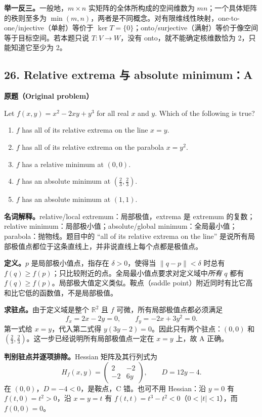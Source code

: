 \documentclass[11pt,a4paper,fontset=fandol]{ctexart}
\begin{document}
\textbf{举一反三。}一般地，$m\times n$ 实矩阵的全体所构成的空间维数为 $mn$；一个具体矩阵的秩则至多为 $\min(m,n)$，两者是不同概念。对有限维线性映射，one-to-one/injective（单射）等价于 $\ker T=\{0\}$；onto/surjective（满射）等价于像空间等于目标空间。若本题只说 $T:V\to W$，没有 onto，就不能确定核维数恰为 2，只能知道它至少为 2。

\subsection{26. Relative extrema 与 absolute minimum：A}
\label{p2:q26}
\textbf{原题（Original problem）}

Let $f(x,y)=x^2-2xy+y^3$ for all real $x$ and $y$. Which of the following is true?
\begin{enumerate}[label=(\Alph*)]
\item $f$ has all of its relative extrema on the line $x=y$.
\item $f$ has all of its relative extrema on the parabola $x=y^2$.
\item $f$ has a relative minimum at $(0,0)$.
\item $f$ has an absolute minimum at $\left(\frac23,\frac23\right)$.
\item $f$ has an absolute minimum at $(1,1)$.
\end{enumerate}
\textbf{名词解释。}relative/local extremum：局部极值，extrema 是 extremum 的复数；relative minimum：局部极小值；absolute/global minimum：全局最小值；parabola：抛物线。题目中的 ``all of its relative extrema on the line'' 是说所有局部极值点都位于这条直线上，并非说直线上每个点都是极值点。

\textbf{定义。}$p$ 是局部极小值点，指存在 $\delta>0$，使得当 $\|q-p\|<\delta$ 时总有 $f(q)\ge f(p)$；只比较附近的点。全局最小值点要求对定义域中\emph{所有} $q$ 都有 $f(q)\ge f(p)$。局部极大值定义类似。鞍点（saddle point）附近同时有比它高和比它低的函数值，不是局部极值。

\textbf{求驻点。}由于定义域是整个 $\mathbb R^2$ 且 $f$ 可微，所有局部极值点都必须满足
\[
f_x=2x-2y=0,\qquad f_y=-2x+3y^2=0.
\]
第一式给 $x=y$，代入第二式得 $y(3y-2)=0$。因此只有两个驻点：$(0,0)$ 和 $(\frac23,\frac23)$。这一步已经说明所有局部极值点一定在 $x=y$ 上，故 A 正确。

\textbf{判别驻点并逐项排除。}Hessian 矩阵及其行列式为
\[
H_f(x,y)=\begin{pmatrix}2&-2\\-2&6y\end{pmatrix},\qquad D=12y-4.
\]
在 $(0,0)$，$D=-4<0$，是鞍点，C 错。也可不用 Hessian：沿 $y=0$ 有 $f(t,0)=t^2>0$，沿 $x=y=t$ 有 $f(t,t)=t^3-t^2<0$（$0<|t|<1$），而 $f(0,0)=0$。
\end{document}
